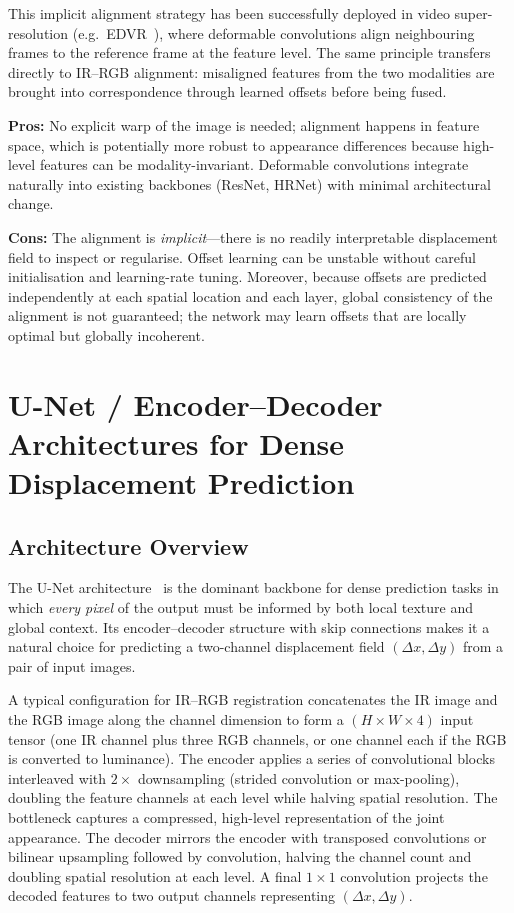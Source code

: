 This implicit alignment strategy has been successfully deployed in
video super-resolution (e.g.\ EDVR~\cite{wang2019edvr}), where
deformable convolutions align neighbouring frames to the reference
frame at the feature level.  The same principle transfers directly to
IR--RGB alignment: misaligned features from the two modalities are
brought into correspondence through learned offsets before being fused.

\noindent\textbf{Pros:} No explicit warp of the image is needed;
alignment happens in feature space, which is potentially more robust to
appearance differences because high-level features can be
modality-invariant.  Deformable convolutions integrate naturally into
existing backbones (ResNet, HRNet) with minimal architectural change.

\noindent\textbf{Cons:} The alignment is \emph{implicit}---there is no
readily interpretable displacement field to inspect or regularise.
Offset learning can be unstable without careful initialisation and
learning-rate tuning.  Moreover, because offsets are predicted
independently at each spatial location and each layer, global
consistency of the alignment is not guaranteed; the network may
learn offsets that are locally optimal but globally incoherent.


\section{U-Net / Encoder--Decoder Architectures for Dense Displacement Prediction}
\label{sec:unet_disp}

\subsection{Architecture Overview}

The U-Net architecture~\cite{ronneberger2015unet} is the dominant
backbone for dense prediction tasks in which \emph{every pixel} of the
output must be informed by both local texture and global context.  Its
encoder--decoder structure with skip connections makes it a natural
choice for predicting a two-channel displacement field
$(\Delta x, \Delta y)$ from a pair of input images.

A typical configuration for IR--RGB registration concatenates the IR
image and the RGB image along the channel dimension to form a
$(H \times W \times 4)$ input tensor (one IR channel plus three RGB
channels, or one channel each if the RGB is converted to luminance).
The encoder applies a series of convolutional blocks interleaved with
$2\times$ downsampling (strided convolution or max-pooling), doubling
the feature channels at each level while halving spatial resolution.
The bottleneck captures a compressed, high-level representation of the
joint appearance.  The decoder mirrors the encoder with transposed
convolutions or bilinear upsampling followed by convolution, halving
the channel count and doubling spatial resolution at each level.  A
final $1 \times 1$ convolution projects the decoded features to two
output channels representing $(\Delta x, \Delta y)$.

